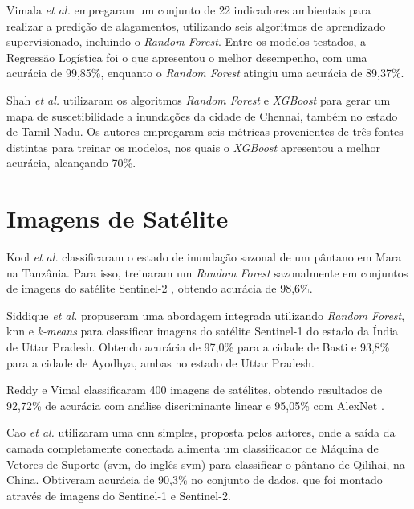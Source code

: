 Vimala \textit{et al.} \cite{vimala2024} empregaram um conjunto de 22 indicadores ambientais para realizar a predição de alagamentos, utilizando seis algoritmos de aprendizado supervisionado, incluindo o \textit{Random Forest}. Entre os modelos testados, a Regressão Logística \cite{cramerlogisticregression} foi o que apresentou o melhor desempenho, com uma acurácia de 99,85\%, enquanto o \textit{Random Forest} atingiu uma acurácia de 89,37\%.

Shah \textit{et al.} \cite{shah2024} utilizaram os algoritmos \textit{Random Forest} e \textit{XGBoost} \cite{chenxgboost} para gerar um mapa de suscetibilidade a inundações da cidade de Chennai, também no estado de Tamil Nadu. Os autores empregaram seis métricas provenientes de três fontes distintas para treinar os modelos, nos quais o \textit{XGBoost} apresentou a melhor acurácia, alcançando 70\%.

\section{Imagens de Satélite}

Kool \textit{et al.} \cite{KOOL2022102766} classificaram o estado de inundação sazonal de um pântano em Mara na Tanzânia. 
Para isso, treinaram um \textit{Random Forest} sazonalmente em conjuntos de imagens do satélite Sentinel-2 \cite{sentinel2}, obtendo acurácia de 98,6\%.

Siddique \textit{et al.} \cite{siddique2023} propuseram uma abordagem integrada utilizando \textit{Random Forest}, \acrfull{knn}\cite{knn1967} e \textit{k-means}\cite{kmeans2023} 
para classificar imagens do satélite Sentinel-1 \cite{sentinel1} do estado da Índia de Uttar Pradesh. Obtendo acurácia de 97,0\% para a cidade de Basti e 93,8\% para a cidade de Ayodhya, ambas no estado de Uttar Pradesh.

Reddy e Vimal \cite{reddy2024} classificaram 400 imagens de satélites, obtendo resultados de 92,72\% de acurácia com análise discriminante linear \cite{lda} e 95,05\% com AlexNet \cite{alexnet}.

Cao \textit{et al.} \cite{cao2024} utilizaram uma \acrshort{cnn} simples, proposta pelos autores, onde a saída da camada completamente conectada alimenta um 
classificador de Máquina de Vetores de Suporte (\acrshort{svm}, do inglês \acrlong{svm}) \cite{svm} para classificar o pântano de Qilihai, na China. Obtiveram acurácia de 90,3\% no conjunto de dados,
que foi montado através de imagens do Sentinel-1 e Sentinel-2.

